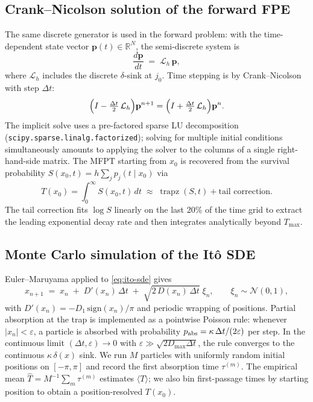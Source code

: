\subsection{Crank--Nicolson solution of the forward FPE}

The same discrete generator is used in the forward problem: with the
time-dependent state vector $\mathbf{p}(t)\in\mathbb{R}^N$, the semi-discrete
system is
\[
\frac{d\mathbf{p}}{dt} \;=\; \mathcal{L}_h\,\mathbf{p},
\]
where $\mathcal{L}_h$ includes the discrete $\delta$-sink at $j_0$.  Time
stepping is by Crank--Nicolson with step $\Delta t$:
\[
\Bigl(I - \tfrac{\Delta t}{2}\,\mathcal{L}_h\Bigr)\mathbf{p}^{n+1}
=\Bigl(I + \tfrac{\Delta t}{2}\,\mathcal{L}_h\Bigr)\mathbf{p}^{n}.
\]
The implicit solve uses a pre-factored sparse LU decomposition
(\texttt{scipy.sparse.linalg.factorized}); solving for multiple initial
conditions simultaneously amounts to applying the solver to the columns of a
single right-hand-side matrix.  The MFPT starting from $x_0$ is recovered from
the survival probability $S(x_0,t)=h\sum_j p_j(t\mid x_0)$ via
\[
T(x_0)=\int_0^\infty\!S(x_0,t)\,dt
\;\approx\; \operatorname{trapz}(S,t) + \text{tail correction}.
\]
The tail correction fits $\log S$ linearly on the last 20\% of the time grid
to extract the leading exponential decay rate and then integrates analytically
beyond $T_{\max}$.

\subsection{Monte Carlo simulation of the It\^o SDE}

Euler--Maruyama applied to \eqref{eq:ito-sde} gives
\[
x_{n+1} \;=\; x_n \;+\; D'(x_n)\,\Delta t \;+\; \sqrt{2\,D(x_n)\,\Delta t}\;\xi_n,
\qquad \xi_n\sim\mathcal{N}(0,1),
\]
with $D'(x_n)=-D_1\,\mathrm{sign}(x_n)/\pi$ and periodic wrapping of positions.
Partial absorption at the trap is implemented as a pointwise Poisson rule:
whenever $|x_n|<\varepsilon$, a particle is absorbed with probability
$p_{\rm abs}=\kappa\,\Delta t/(2\varepsilon)$ per step.  In the continuous
limit $(\Delta t,\varepsilon)\to 0$ with
$\varepsilon\gg\sqrt{2 D_{\max}\Delta t}$, the rule converges to the
continuous $\kappa\,\delta(x)$ sink.  We run $M$ particles with uniformly
random initial positions on $[-\pi,\pi]$ and record the first absorption
time $\tau^{(m)}$.  The empirical mean $\hat T = M^{-1}\sum_m \tau^{(m)}$
estimates $\langle T\rangle$; we also bin first-passage times by starting
position to obtain a position-resolved $T(x_0)$.
